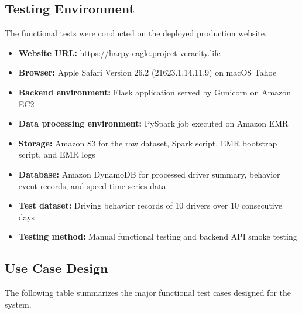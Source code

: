 \documentclass[12pt,a4paper]{article}
\begin{document}
\subsection{Testing Environment}

The functional tests were conducted on the deployed production website.

\begin{itemize}
    \item \textbf{Website URL:} \url{https://harpy-eagle.project-veracity.life}
    \item \textbf{Browser:} Apple Safari Version 26.2 (21623.1.14.11.9) on macOS Tahoe
    \item \textbf{Backend environment:} Flask application served by Gunicorn on Amazon EC2
    \item \textbf{Data processing environment:} PySpark job executed on Amazon EMR
    \item \textbf{Storage:} Amazon S3 for the raw dataset, Spark script, EMR bootstrap script, and EMR logs
    \item \textbf{Database:} Amazon DynamoDB for processed driver summary, behavior event records, and speed time-series data
    \item \textbf{Test dataset:} Driving behavior records of 10 drivers over 10 consecutive days
    \item \textbf{Testing method:} Manual functional testing and backend API smoke testing
\end{itemize}

\subsection{Use Case Design}

The following table summarizes the major functional test cases designed for the system.
\end{document}

